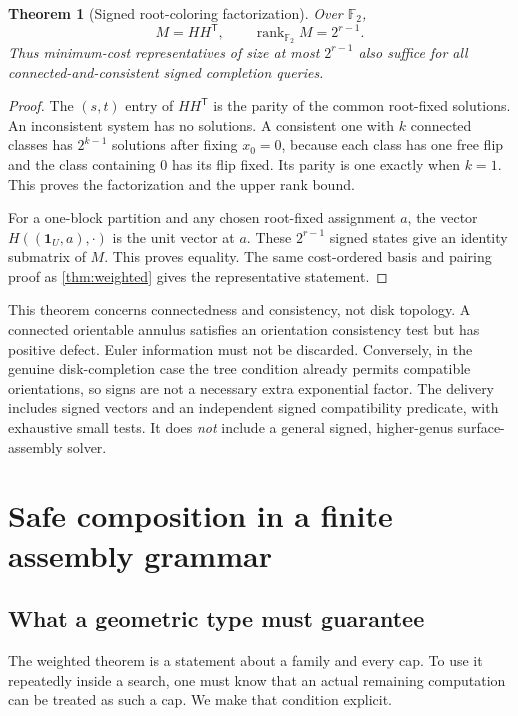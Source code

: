 \documentclass[11pt,a4paper]{article}
\newtheorem{theorem}{Theorem}[section]
\theoremstyle{definition}
\theoremstyle{remark}
\newcommand{\F}{\mathbb F_2}
\newcommand{\rk}{\operatorname{rank}}
\newcommand{\one}{\boldsymbol{1}}
\begin{document}
\begin{theorem}[Signed root-coloring factorization]\label{thm:signed}
Over $\F$,
\[
                          M=HH^{\mathsf T},\qquad \rk_{\F}M=2^{r-1}.
\]
Thus minimum-cost representatives of size at most $2^{r-1}$ also suffice for all
connected-and-consistent signed completion queries.
\end{theorem}
\begin{proof}
The $(s,t)$ entry of $HH^{\mathsf T}$ is the parity of the common root-fixed
solutions. An inconsistent system has no solutions. A consistent one with $k$
connected classes has $2^{k-1}$ solutions after fixing $x_0=0$, because each class
has one free flip and the class containing $0$ has its flip fixed. Its parity is one
exactly when $k=1$. This proves the factorization and the upper rank bound.

For a one-block partition and any chosen root-fixed assignment $a$, the vector
$H((\one_U,a),\cdot)$ is the unit vector at $a$. These $2^{r-1}$ signed states
give an identity submatrix of $M$. This proves equality. The same cost-ordered
basis and pairing proof as \cref{thm:weighted} gives the representative statement.
\end{proof}

This theorem concerns connectedness and consistency, not disk topology. A connected
orientable annulus satisfies an orientation consistency test but has positive defect.
Euler information must not be discarded. Conversely, in the genuine disk-completion
case the tree condition already permits compatible orientations, so signs are not a
necessary extra exponential factor. The delivery includes signed vectors and an
independent signed compatibility predicate, with exhaustive small tests. It does
\emph{not} include a general signed, higher-genus surface-assembly solver.

\section{Safe composition in a finite assembly grammar}\label{sec:composition}
\subsection{What a geometric type must guarantee}
The weighted theorem is a statement about a family and every cap. To use it repeatedly
inside a search, one must know that an actual remaining computation can be treated as
such a cap. We make that condition explicit.
\end{document}
